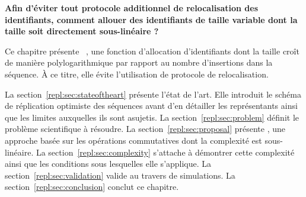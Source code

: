 \textbf{Afin d'éviter tout protocole additionnel de relocalisation des
identifiants, comment allouer des identifiants de taille variable dont la taille
soit directement sous-linéaire ?}

Ce chapitre présente \LSEQ~\cite{nedelec2013concurrency, nedelec2013lseq}, une
fonction d'allocation d'identifiants dont la taille croît de manière
polylogarithmique par rapport au nombre d'insertions dans la séquence. À ce
titre, elle évite l'utilisation de protocole de relocalisation.

La section~\ref{repl:sec:stateoftheart} présente l'état de l'art. Elle introduit
le schéma de réplication optimiste des séquences avant d'en détailler les
représentants ainsi que les limites auxquelles ils sont asujetis.  La
section~\ref{repl:sec:problem} définit le problème scientifique à résoudre. La
section~\ref{repl:sec:proposal} présente \LSEQ, une approche basée sur les
opérations commutatives dont la complexité est sous-linéaire. La
section~\ref{repl:sec:complexity} s'attache à démontrer cette complexité ainsi
que les conditions sous lesquelles elle s'applique. La
section~\ref{repl:sec:validation} valide \LSEQ au travers de simulations. La
section~\ref{repl:sec:conclusion} conclut ce chapitre.



